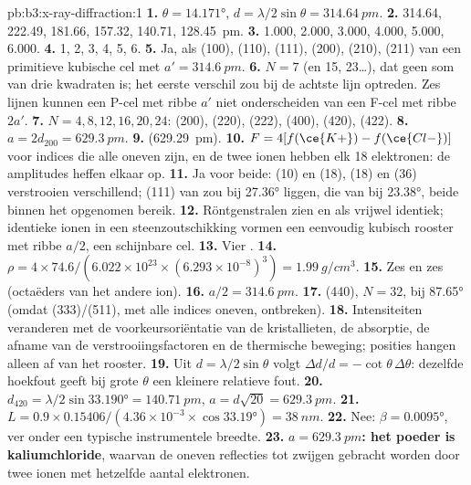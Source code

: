 \begin{solution}{pb:b3:x-ray-diffraction:1}
\textbf{1.} $\theta = \ang{14.171}$, $d = \lambda/2\sin\theta = \qty{314.64}{pm}$.
\textbf{2.} 314.64, 222.49, 181.66, 157.32, 140.71, \qty{128.45}{pm}.
\textbf{3.} 1.000, 2.000, 3.000, 4.000, 5.000, 6.000.
\textbf{4.} 1, 2, 3, 4, 5, 6.
\textbf{5.} Ja, als (100), (110), (111), (200), (210), (211) van een
primitieve kubische cel met $a' = \qty{314.6}{pm}$.
\textbf{6.} $N = 7$ (en 15, 23\dots), dat geen som van drie kwadraten is;
het eerste verschil zou bij de achtste lijn optreden. Zes lijnen kunnen een
P-cel met ribbe $a'$ niet onderscheiden van een F-cel met ribbe $2a'$.
\textbf{7.} $N = 4, 8, 12, 16, 20, 24$: (200), (220), (222), (400), (420), (422).
\textbf{8.} $a = 2d_{200} = \qty{629.3}{pm}$.
\textbf{9.}  (\qty{629.29}{pm}).
\textbf{10.} $F = 4[f(\ce{K+}) - f(\ce{Cl-})]$ voor indices die alle oneven
zijn, en de twee ionen hebben elk 18
elektronen: de amplitudes heffen elkaar op.
\textbf{11.} Ja voor beide:  (10) en  (18),  (18) en
 (36) verstrooien verschillend; (111) van  zou bij
\ang{27.36} liggen, die van  bij \ang{23.38}, beide binnen het
opgenomen bereik.
\textbf{12.} Röntgenstralen zien  en  als vrijwel identiek;
identieke ionen in een steenzoutschikking vormen een eenvoudig kubisch
rooster met ribbe $a/2$, een schijnbare cel.
\textbf{13.} Vier .
\textbf{14.} $\rho = 4 \times 74.6/(6.022\times10^{23} \times (6.293\times10^{-8})^3) =
\qty{1.99}{g/cm^3}$.
\textbf{15.} Zes en zes (octaëders van het andere ion).
\textbf{16.} $a/2 = \qty{314.6}{pm}$.
\textbf{17.} (440), $N = 32$, bij \ang{87.65} (omdat (333)/(511), met alle
indices oneven, ontbreken).
\textbf{18.} Intensiteiten veranderen met de voorkeursoriëntatie van de
kristallieten, de absorptie, de afname van de verstrooiingsfactoren en de
thermische beweging; posities hangen alleen af van het rooster.
\textbf{19.} Uit $d = \lambda/2\sin\theta$ volgt $\Delta d/d = -\cot\theta\,\Delta\theta$: dezelfde
hoekfout geeft bij grote $\theta$ een kleinere relatieve fout.
\textbf{20.} $d_{420} = \lambda/2\sin\ang{33.190} = \qty{140.71}{pm}$, $a = d\sqrt{20} =
\qty{629.3}{pm}$.
\textbf{21.} $L = 0.9 \times 0.15406/(4.36\times10^{-3} \times \cos\ang{33.19}) = \qty{38}{nm}$.
\textbf{22.} Nee: $\beta = \ang{0.0095}$, ver onder een typische
instrumentele breedte.
\textbf{23.} \textbf{$a = \qty{629.3}{pm}$: het poeder is kaliumchloride},
waarvan de oneven reflecties tot zwijgen gebracht worden door twee ionen
met hetzelfde aantal elektronen.
\end{solution}
